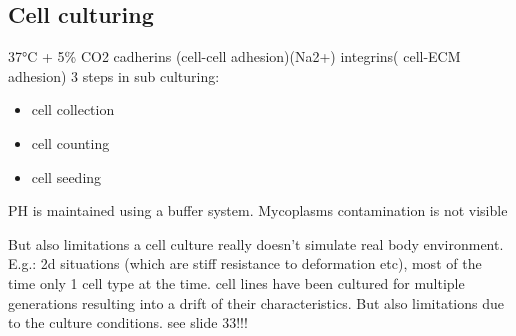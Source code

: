 \documentclass{article}
\begin{document}
\subsection{Cell culturing}

37°C + 5\% CO2
cadherins (cell-cell adhesion)(Na2+)
integrins( cell-ECM adhesion)
3 steps in sub culturing:
\begin{itemize}
    \item cell collection
    \item cell counting
    \item cell seeding
\end{itemize}
PH is maintained using a buffer system. Mycoplasms contamination is not visible

But also limitations a cell culture really doesn't simulate real body environment. E.g.: 2d situations (which are stiff resistance to deformation etc), most of the time only 1 cell type at the time. cell lines have been cultured for multiple generations resulting into a drift of their characteristics.
But also limitations due to the culture conditions. see slide 33!!!
\end{document}
